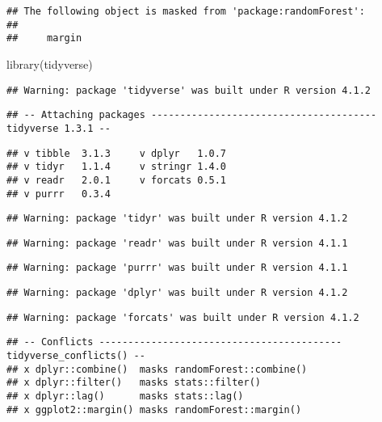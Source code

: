 \documentclass[
]{article}
\newenvironment{Shaded}{\begin{snugshade}}{\end{snugshade}}
\newcommand{\FunctionTok}[1]{\textcolor[rgb]{0.00,0.00,0.00}{#1}}
\newcommand{\NormalTok}[1]{#1}
\begin{document}
\begin{verbatim}
## The following object is masked from 'package:randomForest':
## 
##     margin
\end{verbatim}

\begin{Shaded}
\begin{Highlighting}[]
\FunctionTok{library}\NormalTok{(tidyverse)}
\end{Highlighting}
\end{Shaded}

\begin{verbatim}
## Warning: package 'tidyverse' was built under R version 4.1.2
\end{verbatim}

\begin{verbatim}
## -- Attaching packages --------------------------------------- tidyverse 1.3.1 --
\end{verbatim}

\begin{verbatim}
## v tibble  3.1.3     v dplyr   1.0.7
## v tidyr   1.1.4     v stringr 1.4.0
## v readr   2.0.1     v forcats 0.5.1
## v purrr   0.3.4
\end{verbatim}

\begin{verbatim}
## Warning: package 'tidyr' was built under R version 4.1.2
\end{verbatim}

\begin{verbatim}
## Warning: package 'readr' was built under R version 4.1.1
\end{verbatim}

\begin{verbatim}
## Warning: package 'purrr' was built under R version 4.1.1
\end{verbatim}

\begin{verbatim}
## Warning: package 'dplyr' was built under R version 4.1.2
\end{verbatim}

\begin{verbatim}
## Warning: package 'forcats' was built under R version 4.1.2
\end{verbatim}

\begin{verbatim}
## -- Conflicts ------------------------------------------ tidyverse_conflicts() --
## x dplyr::combine()  masks randomForest::combine()
## x dplyr::filter()   masks stats::filter()
## x dplyr::lag()      masks stats::lag()
## x ggplot2::margin() masks randomForest::margin()
\end{verbatim}
\end{document}
